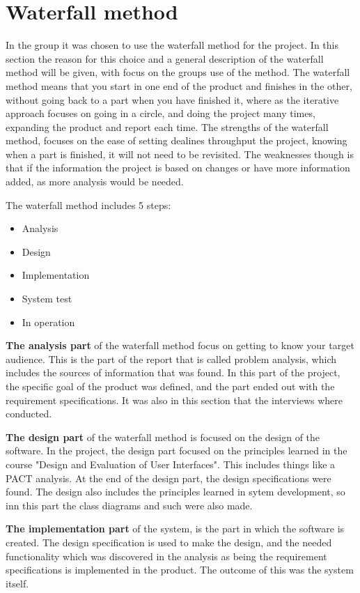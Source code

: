 \section{Waterfall method}

In the group it was chosen to use the waterfall method for the project. In this section the reason for this choice and a general description of the waterfall method will be given, with focus on the groups use of the method. The waterfall method means that you start in one end of the product and finishes in the other, without going back to a part when you have finished it, where as the iterative approach focuses on going in a circle, and doing the project many times, expanding the product and report each time. The strengths of the waterfall method, focuses on the ease of setting dealines throughput the project, knowing when a part is finished, it will not need to be revisited. The weaknesses though is that if the information the project is based on changes or have more information added, as more analysis would be needed. 

The waterfall method includes 5 steps:

\begin{itemize}
	\item Analysis
	\item Design
	\item Implementation
	\item System test
	\item In operation
\end{itemize}

\textbf{The analysis part} of the waterfall method focus on getting to know your target audience. This is the part of the report that is called problem analysis, which includes the sources of information that was found. In this part of the project, the specific goal of the product was defined, and the part ended out with the requirement specifications. It was also in this section that the interviews where conducted.

\textbf{The design part} of the waterfall method is focused on the design of the software. In the project, the design part focused on the principles learned in the course "Design and Evaluation of User Interfaces". This includes things like a PACT analysis. At the end of the design part, the design specifications were found. The design also includes the principles learned in sytem development, so inn this part the class diagrams and such were also made.

\textbf{The implementation part} of the system, is the part in which the software is created. The design specification is used to make the design, and the needed functionality which was discovered in the analysis as being the requirement specifications is implemented in the product. The outcome of this was the system itself.

